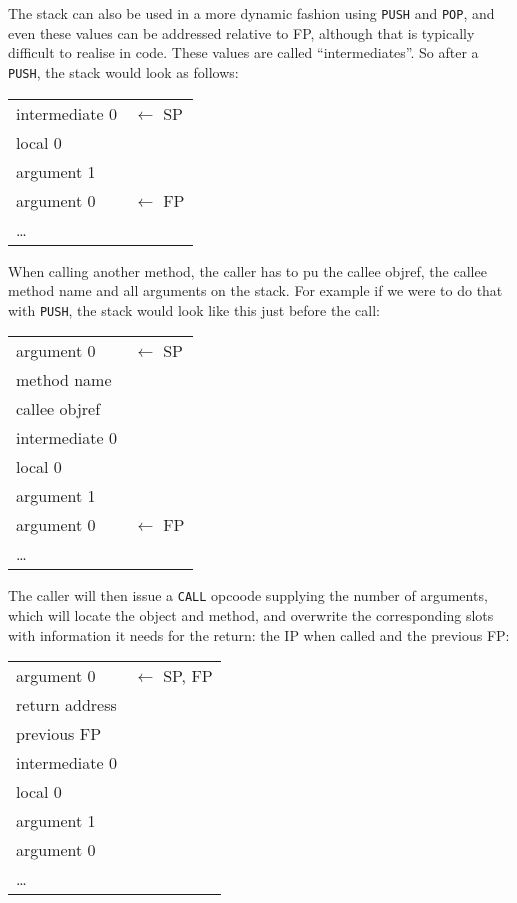 \documentclass[12pt,a4paper]{article}
\begin{document}
The stack can also be used in a more dynamic fashion using \verb|PUSH| and \verb|POP|, and even these values can be addressed relative to FP, although that is typically difficult to realise in code. These values are called ``intermediates''. So after a \verb|PUSH|, the stack would look as follows:

\begin{table}[H]
\centering
\begin{tabular}{|p{3cm}|p{3cm}}
intermediate 0 & $\leftarrow$ SP \\
local 0    \\    
argument 1 \\
argument 0 & $\leftarrow$ FP \\ 
\cline{1-1}
\ldots & \\
\end{tabular}
\end{table}

When calling another method, the caller has to pu the callee objref, the callee method name and all arguments on the stack. For example if we were to do that with \verb|PUSH|, the stack would look like this just before the call:

\begin{table}[H]
\centering
\begin{tabular}{|p{3cm}|p{3cm}}
argument 0 & $\leftarrow$ SP \\
method name \\
callee objref \\
intermediate 0 \\
local 0    \\    
argument 1 \\
argument 0 & $\leftarrow$ FP \\ 
\cline{1-1}
\ldots & \\
\end{tabular}
\end{table}

The caller will then issue a \verb|CALL| opcoode supplying the number of arguments, which will locate the object and method, and overwrite the corresponding slots with information it needs for the return: the IP when called and the previous FP:

\begin{table}[H]
\centering
\begin{tabular}{|p{3cm}|p{3cm}}
argument 0 & $\leftarrow$ SP, FP \\
\cline{1-1}
return address \\
previous FP \\
intermediate 0 \\
local 0    \\    
argument 1 \\
argument 0 \\
\cline{1-1}
\ldots & \\
\end{tabular}
\end{table}
\end{document}
